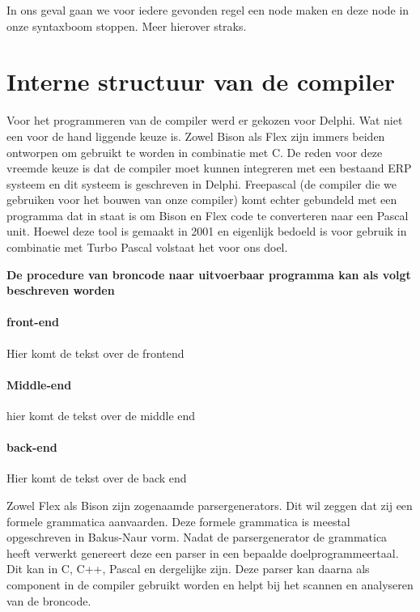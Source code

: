 \documentclass[10pt,a4paper]{article}
\begin{document}
In ons geval gaan we voor iedere gevonden regel een node maken en deze node in onze syntaxboom stoppen. Meer hierover straks.

\section{Interne structuur van de compiler}
Voor het programmeren van de compiler werd er gekozen voor Delphi. Wat niet een voor de hand liggende keuze is. Zowel Bison als Flex zijn immers beiden ontworpen om gebruikt te worden in combinatie met C. De reden voor deze vreemde keuze is dat de compiler moet kunnen integreren met een bestaand ERP systeem en dit systeem is geschreven in Delphi. Freepascal (de compiler die we gebruiken voor het bouwen van onze compiler) komt echter gebundeld met een programma dat in staat is om Bison en Flex code te converteren naar een Pascal unit. Hoewel deze tool is gemaakt in 2001 en eigenlijk bedoeld is voor gebruik in combinatie met Turbo Pascal volstaat het voor ons doel.

\begin{center}
\textbf{De procedure van broncode naar uitvoerbaar programma kan als volgt beschreven worden}
\end{center}

\paragraph{\textbf{front-end}}
Hier komt de tekst over de frontend

\paragraph{\textbf{Middle-end}}
hier komt de tekst over de middle end

\paragraph{\textbf{back-end}}
Hier komt de tekst over de back end

Zowel Flex als Bison zijn zogenaamde parsergenerators. Dit wil zeggen dat zij een formele grammatica aanvaarden. Deze formele grammatica is meestal opgeschreven in Bakus-Naur vorm. Nadat de parsergenerator de grammatica heeft verwerkt genereert deze een parser in een bepaalde doelprogrammeertaal. Dit kan in C, C++, Pascal en dergelijke zijn. Deze parser kan daarna als component in de compiler gebruikt worden en helpt bij het scannen en analyseren van de broncode.
\end{document}
